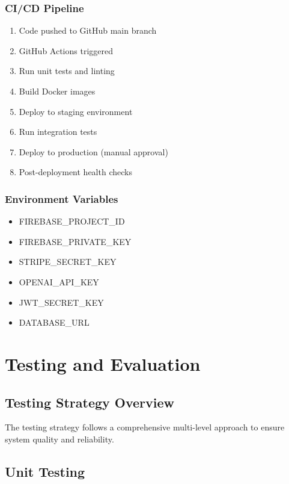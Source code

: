 \documentclass[12pt,a4paper]{article}
\begin{document}
\subsubsection{CI/CD Pipeline}
\begin{enumerate}
    \item Code pushed to GitHub main branch
    \item GitHub Actions triggered
    \item Run unit tests and linting
    \item Build Docker images
    \item Deploy to staging environment
    \item Run integration tests
    \item Deploy to production (manual approval)
    \item Post-deployment health checks
\end{enumerate}

\subsubsection{Environment Variables}
\begin{itemize}
    \item FIREBASE\_PROJECT\_ID
    \item FIREBASE\_PRIVATE\_KEY
    \item STRIPE\_SECRET\_KEY
    \item OPENAI\_API\_KEY
    \item JWT\_SECRET\_KEY
    \item DATABASE\_URL
\end{itemize}

\newpage

\section{Testing and Evaluation}

\subsection{Testing Strategy Overview}
The testing strategy follows a comprehensive multi-level approach to ensure system quality and reliability.

\subsection{Unit Testing}
\end{document}
